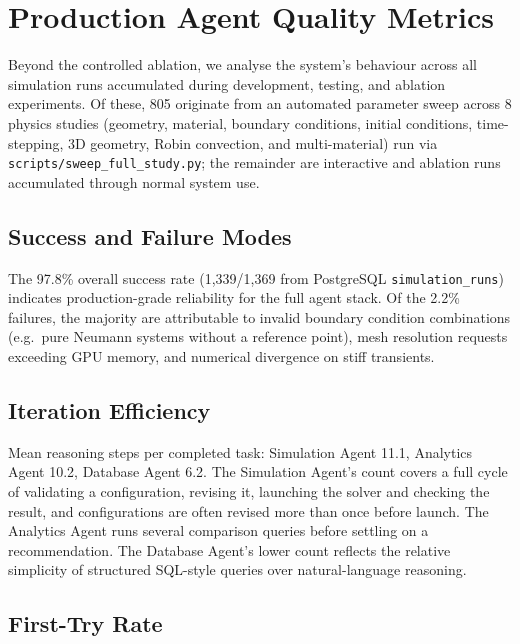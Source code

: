 \documentclass[twocolumn]{article}
\newif\ifrevisionsvisible
\newcommand{\revised}[1]{%
  \ifrevisionsvisible\textcolor{revisionred}{#1}\else#1\fi}
\begin{document}
\section{Production Agent Quality Metrics}
\label{sec:metrics}

Beyond the controlled ablation, we analyse the system's behaviour across all
simulation runs accumulated during development, testing, and ablation
experiments.  Of these, 805 originate from an automated parameter sweep across 8 physics
studies (geometry, material, boundary conditions, initial conditions,
time-stepping, 3D geometry, Robin convection, and multi-material) run via
\texttt{scripts/sweep\_full\_study.py}; the remainder are interactive and
ablation runs accumulated through normal system use.



\subsection{Success and Failure Modes}

The 97.8\% overall success rate (1{,}339/1{,}369 from PostgreSQL
\texttt{simulation\_runs}) indicates production-grade reliability
for the full agent stack.  Of the 2.2\% failures, the majority are attributable to invalid boundary condition
combinations (e.g.\ pure Neumann systems without a reference point), mesh
resolution requests exceeding GPU memory, and numerical divergence on
stiff transients.

\subsection{Iteration Efficiency}

\revised{Mean reasoning steps per completed task: Simulation Agent 11.1,
Analytics Agent 10.2, Database Agent 6.2.  The Simulation Agent's count
covers a full cycle of validating a configuration, revising it, launching
the solver and checking the result, and configurations are often revised
more than once before launch.  The Analytics Agent runs several
comparison queries before settling on a recommendation.}  The Database
Agent's lower count reflects the relative simplicity of structured
SQL-style queries over natural-language reasoning.

\subsection{First-Try Rate}
\end{document}
